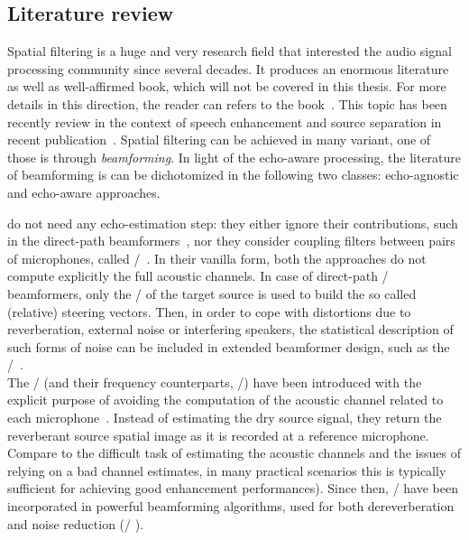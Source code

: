 \subsection{Literature review}
Spatial filtering is a huge and very research field that interested the audio signal processing community since several decades.
It produces an enormous literature as well as well-affirmed book, which will not be covered in this thesis.
For more details in this direction, the reader can refers to the book~.
This topic has been recently review in the context of speech enhancement and source separation in recent publication~.
Spatial filtering can be achieved in many variant, one of those is through \textit{beamforming}.
In light of the echo-aware processing, the literature of beamforming is can be dichotomized in the following two classes: echo-agnostic and echo-aware approaches.

 do not need any echo-estimation step:
they either ignore their contributions, such in the direct-path beamformers~, nor they consider coupling filters between pairs of microphones, called \ReIRdef/~.
In their vanilla form, both the approaches do not compute explicitly the full acoustic channels.
In case of direct-path \DStxtdef/ beamformers, only the \DOAs/ of the target source is used to build the so called (relative) steering vectors.
Then, in order to cope with distortions due to reverberation, external noise or interfering speakers, the statistical description of such forms of noise can be included in extended beamformer design, such as the \MVDRtxt/~.
\\The \ReIRs/ (and their frequency counterparts, \ReTFs/) have been introduced with the explicit purpose of avoiding the computation of the acoustic channel related to each microphone~.
Instead of estimating the dry source signal, they return the reverberant source spatial image as it is recorded at a reference microphone.
Compare to the difficult task of estimating the acoustic channels and the issues of relying on a bad channel estimates, in many practical scenarios this is typically sufficient for achieving good enhancement performances).
Since then, \ReIRs/ have been incorporated in powerful beamforming algorithms, used for both dereverberation and noise reduction (\eg/ ).

